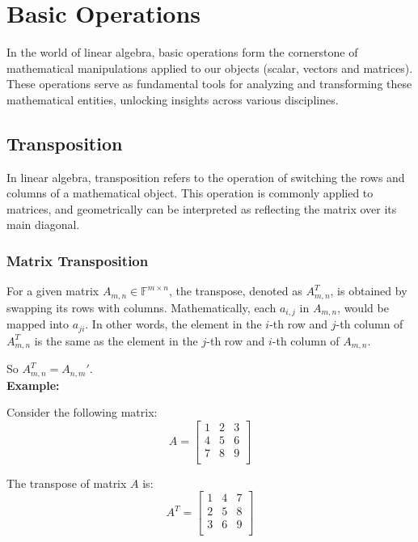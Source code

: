 \section{Basic Operations}
In the world of linear algebra, basic operations form the cornerstone of mathematical manipulations applied to our objects (scalar, vectors and matrices). These operations serve as fundamental tools for analyzing and transforming these mathematical entities, unlocking insights across various disciplines.

\subsection{Transposition}

In linear algebra, transposition refers to the operation of switching the rows and columns of a mathematical object. This operation is commonly applied to matrices, and geometrically can be interpreted as reflecting the matrix over its main diagonal.

\subsubsection{Matrix Transposition}

For a given matrix $A_{m,n} \in \mathbb F^{m \times n}$, the transpose, denoted as $A_{m,n}^T$, is obtained by swapping its rows with columns. Mathematically, each $a_{i,j}$ in $A_{m,n}$, would be mapped into $a_{ji}$. In other words, the element in the $i$-th row and $j$-th column of $A_{m,n}^T$ is the same as the element in the $j$-th row and $i$-th column of $A_{m,n}$.

So $A_{m,n}^T = A_{n,m}'$.
\\

\textbf{Example:}

Consider the following matrix:
\[
A = \begin{bmatrix}
    1 & 2 & 3 \\
    4 & 5 & 6 \\
    7 & 8 & 9 \\
\end{bmatrix}
\]

The transpose of matrix $A$ is:
\[
A^T = \begin{bmatrix}
    1 & 4 & 7 \\
    2 & 5 & 8 \\
    3 & 6 & 9 \\
\end{bmatrix}
\]

